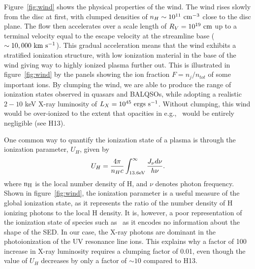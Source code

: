 \documentclass[useAMS,usenatbib]{mn2e_x}
\begin{document}
Figure~\ref{fig:wind} shows the physical properties of the wind.
The wind rises slowly from the disc at first, with clumped densities
of $n_H \sim 10^{11}~\rm{cm^{-3}}$ close to the disc plane.
The flow then accelerates over a scale length of $R_V=10^{19}~\rm{cm}$
up to a terminal velocity equal to the escape velocity at the streamline base
($\sim10,000~\rm{km~s^{-1}}$). This gradual acceleration means that
the wind exhibits a stratified ionization structure, with low ionization material
in the base of the wind giving way to highly ionized plasma further out.
This is illustrated in figure~\ref{fig:wind} 
by the panels showing the ion fraction $F=n_j/n_{tot}$ of some important ions.
By clumping the wind, we are able to produce the range of ionization states observed
in quasars and BALQSOs, while adopting a realistic $2-10$ keV X-ray luminosity
of $L_{X}=10^{45}~\rm{ergs~s^{-1}}$. Without clumping, this wind would be over-ionized 
to the extent that opacities in e.g., \civ\ would be entirely negligible (see H13).

One common way to quantify the ionization state of a plasma
is through the ionization parameter, $U_H$, given by
\begin{equation}
U_H = \frac{4\pi}{n_H c}\int_{13.6{\rm{eV}}}^{\infty}\frac{{J_{\nu}d\nu}}{h\nu}.
\end{equation}
\noindent where $\rm{n_H}$ is the local number density of H, and $\nu$ denotes photon 
frequency. Shown in figure~\ref{fig:wind},
the ionization parameter is a useful measure of the global ionization state,
as it represents the ratio of the number density of 
H ionizing photons to the local H density.
It is, however, a poor representation of the 
ionization state of species such as \civ\ as it encodes no information
about the shape of the SED. In our case, the X-ray photons 
are dominant in the photoionization of the UV resonance line ions. 
This explains why a factor of 100 increase in X-ray luminosity requires
a clumping factor of 0.01, even though the value of $U_H$ decreases by only a factor of $\sim10$ 
compared to H13. 
\end{document}
